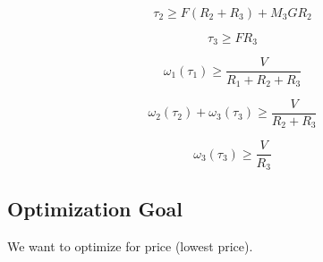 \documentclass{article}
\begin{document}
\begin{equation}
    \tau_2 \geq F(R_2 + R_3) + M_3 G R_2
\end{equation}

\begin{equation}
    \tau_3 \geq F R_3
\end{equation}

\begin{equation}
    \omega_1(\tau_1) \geq \frac{V}{R_1 + R_2 + R_3}
\end{equation}

\begin{equation}
    \omega_2(\tau_2) + \omega_3(\tau_3) \geq \frac{V}{R_2 + R_3}
\end{equation}

\begin{equation}
    \omega_3(\tau_3) \geq \frac{V}{R_3}
\end{equation}

\FloatBarrier
\subsection{Optimization Goal}

We want to optimize for price (lowest price).
\end{document}
